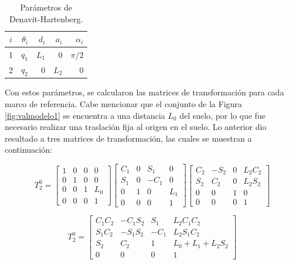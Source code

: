 \begin{table}[H]
  \centering
  \caption{Parámetros de Denavit-Hartenberg.}
    \begin{tabular}{|c|r|r|r|r|}
    \hline
    $ i $ & $ \theta_i $  & $ d_i $  & $ a_i $  & $ \alpha_i $ \\
    \hline
    1 & $ q_1 $  & $ L_1 $  &  0 & $ \pi/2 $ \\
    \hline
    2 &  $ q_2 $ &  0 & $ L_2 $  & 0 \\
    \hline
    \end{tabular}%
  \label{tab:valmodelo1}%
\end{table}%

Con estos parámetros, se calcularon las matrices de transformación para cada marco de referencia. Cabe mencionar que el conjunto de la Figura \ref{fig:valmodelo1} se encuentra a una distancia $ L_0 $ del suelo, por lo que fue necesario realizar una traslación fija al origen en el suelo. Lo anterior dio resultado a tres matrices de transformación, las cuales se muestran a continuación:

\begin{equation} 
    T_2^0=
    \begin{bmatrix}
        1 & 0 & 0 & 0 \\
        0 & 1 & 0 & 0 \\
        0 & 0 & 1 & L_0 \\
        0 & 0 & 0 & 1
    \end{bmatrix}
    \begin{bmatrix}
        C_1 & 0 & S_1 & 0 \\
        S_1 & 0 & -C_1 & 0 \\
        0 & 1 & 0 & L_1 \\
        0 & 0 & 0 & 1
    \end{bmatrix}
    \begin{bmatrix}
        C_2 & -S_2 & 0 & L_2 C_2 \\
        S_2 & C_2 & 0 & L_2 S_2 \\
        0 & 0 & 1 & 0 \\
        0 & 0 & 0 & 1
    \end{bmatrix}
\end{equation}

\begin{equation} \label{eq:valmodelo1}
    T_2^0=
    \begin{bmatrix}
        C_1 C_2 & -C_1 S_2 & S_1 & L_2 C_1 C_2 \\
        S_1 C_2 & -S_1 S_2 & -C_1 & L_2 S_1 C_2 \\
        S_2 & C_2 & 1 & L_0 + L_1 + L_2 S_2 \\
        0 & 0 & 0 & 1
    \end{bmatrix}
\end{equation}

